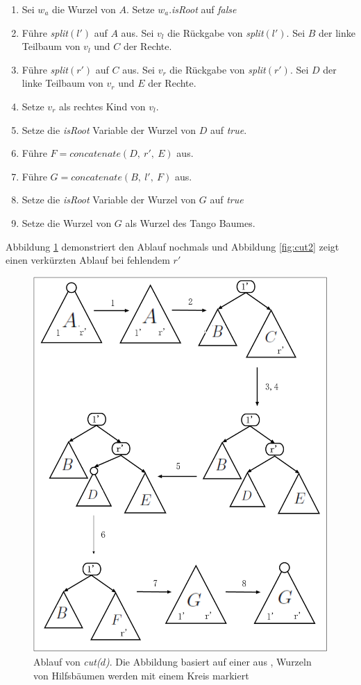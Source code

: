 \documentclass[a4paper,12pt]{article}
\begin{document}
\begin{enumerate}
	\item Sei $w_a$ die Wurzel von $A$. Setze $w_a$.\textit{isRoot} auf \textit{false} 
	\item Führe \textit{split}$\left(l'\right)$ auf $A$ aus. Sei $v_l$ die Rückgabe von \textit{split}$\left(l'\right)$. Sei $B$ der linke Teilbaum von $v_l$ und $C$ der Rechte. 
	\item Führe \textit{split}$\left(r'\right)$ auf $C$ aus. Sei $v_r$ die Rückgabe von \textit{split}$\left(r'\right)$. Sei $D$ der linke Teilbaum von $v_r$ und $E$ der Rechte. 
	\item Setze $v_r$ als rechtes Kind von $v_l$. 
	\item Setze die \textit{isRoot} Variable der Wurzel von $D$ auf \textit{true}.
	\item Führe $F = \textit{concatenate}\left(D, ~ r', ~ E \right)$ aus.
	\item Führe $G = \textit{concatenate}\left(B, ~ l',~ F \right)$ aus.
	\item Setze die \textit{isRoot} Variable der Wurzel von $G$ auf \textit{true} 
	\item Setze die Wurzel von $G$ als Wurzel des Tango Baumes.	 
\end{enumerate}
Abbildung \ref{fig:cut} demonstriert den Ablauf nochmals und Abbildung \ref{fig:cut2} zeigt einen verkürzten Ablauf bei fehlendem $r'$
\begin{figure}[H]
	\centering
	\includegraphics[width=1\textwidth]{"Medien/Tango/cut"}
	\caption{Ablauf von \textit{cut($d$)}. Die Abbildung basiert auf einer aus \cite{demainDinamicOpti}, Wurzeln von Hilfsbäumen werden mit einem Kreis markiert }
	\label{fig:cut}
\end{figure}
\end{document}
